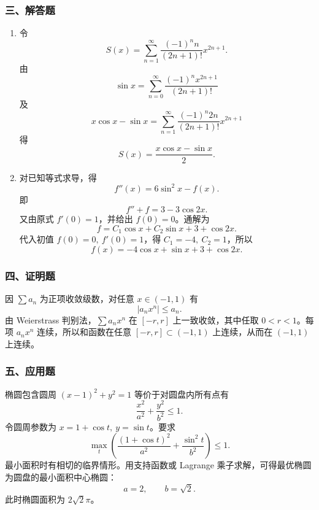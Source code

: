 \subsubsection*{三、解答题}
\begin{enumerate}
  \item 令
  \[
  S(x)=\sum_{n=1}^{\infty}\frac{(-1)^n n}{(2n+1)!}x^{2n+1}.
  \]
  由
  \[
  \sin x=\sum_{n=0}^{\infty}\frac{(-1)^n x^{2n+1}}{(2n+1)!}
  \]
  及
  \[
  x\cos x-\sin x=\sum_{n=1}^{\infty}\frac{(-1)^n 2n}{(2n+1)!}x^{2n+1}
  \]
  得
  \[
  S(x)=\frac{x\cos x-\sin x}{2}.
  \]
  \item 对已知等式求导，得
  \[
  f''(x)=6\sin^2x-f(x).
  \]
  即
  \[
  f''+f=3-3\cos2x.
  \]
  又由原式 $f'(0)=1$，并给出 $f(0)=0$。通解为
  \[
  f=C_1\cos x+C_2\sin x+3+\cos2x.
  \]
  代入初值 $f(0)=0,\ f'(0)=1$，得 $C_1=-4,\ C_2=1$，所以
  \[
  f(x)=-4\cos x+\sin x+3+\cos2x.
  \]
\end{enumerate}

\subsubsection*{四、证明题}
因 $\sum a_n$ 为正项收敛级数，对任意 $x\in(-1,1)$ 有
\[
|a_nx^n|\le a_n.
\]
由 Weierstrass 判别法，$\sum a_nx^n$ 在 $[-r,r]$ 上一致收敛，其中任取 $0<r<1$。每项 $a_nx^n$ 连续，所以和函数在任意 $[-r,r]\subset(-1,1)$ 上连续，从而在 $(-1,1)$ 上连续。

\subsubsection*{五、应用题}
椭圆包含圆周 $(x-1)^2+y^2=1$ 等价于对圆盘内所有点有
\[
\frac{x^2}{a^2}+\frac{y^2}{b^2}\le1.
\]
令圆周参数为 $x=1+\cos t,\ y=\sin t$。要求
\[
\max_t\left(\frac{(1+\cos t)^2}{a^2}+\frac{\sin^2t}{b^2}\right)\le1.
\]
最小面积时有相切的临界情形。用支持函数或 Lagrange 乘子求解，可得最优椭圆为圆盘的最小面积中心椭圆：
\[
a=2,\qquad b=\sqrt2.
\]
此时椭圆面积为 $2\sqrt2\pi$。
